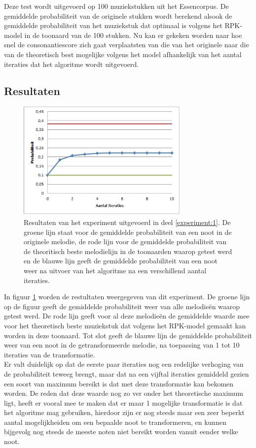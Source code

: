 Deze test wordt uitgevoerd op 100 muziekstukken uit het Essencorpus. De gemiddelde probabiliteit van de originele stukken wordt berekend alsook de gemiddelde probabiliteit van het muziekstuk dat optimaal is volgens het RPK-model in de toonaard van de 100 stukken. Nu kan er gekeken worden naar hoe snel de consonantiescore zich gaat verplaatsten van die van het originele naar die van de theoretisch best mogelijke volgens het model afhankelijk van het aantal iteraties dat het algoritme wordt uitgevoerd.

\subsection{Resultaten}

\begin{figure}[!ht]
  \centering
  \includegraphics[width=0.75\textwidth]{5_Experimenten_Resultaten/exp1_res}
  \caption{Resultaten van het experiment uitgevoerd in deel \ref{experiment:1}. De groene lijn staat voor de gemiddelde probabiliteit van een noot in de originele melodie, de rode lijn voor de gemiddelde probabiliteit van de theoritisch beste melodielijn in de toonaarden waarop getest werd en de blauwe lijn geeft de gemiddelde probabiliteit van een noot weer na uitvoer van het algoritme na een verschillend aantal iteraties.}
  \label{figuur:exp1}
\end{figure}

In figuur \ref{figuur:exp1} worden de restultaten weergegeven van dit experiment. De groene lijn op de figuur geeft de gemiddelde probabiliteit weer van alle melodie\"en waarop getest werd. De rode lijn geeft voor al deze melodie\"en de gemiddelde waarde mee voor het theoretisch beste muziekstuk dat volgens het RPK-model gemaakt kan worden in deze toonaard. Tot slot geeft de blauwe lijn de gemiddelde probabiliteit weer van een noot in de getransformeerde melodie, na toepassing van 1 tot 10 iteraties van de transformatie.\\
Er valt duidelijk op dat de eerste paar iteraties nog een redelijke verhoging van de probabiliteit teweeg brengt, maar dat na een vijftal iteraties gemiddeld gezien een soort van maximum bereikt is dat met deze transformatie kan bekomen worden. De reden dat deze waarde nog zo ver onder het theoretische maximum ligt, heeft er vooral mee te maken dat er maar 1 mogelijke transformatie is dat het algoritme mag gebruiken, hierdoor zijn er nog steeds maar een zeer beperkt aantal mogelijkheiden om een bepaalde noot te transformeren, en kunnen bijgevolg nog steeds de meeste noten niet bereikt worden vanuit eender welke noot.

